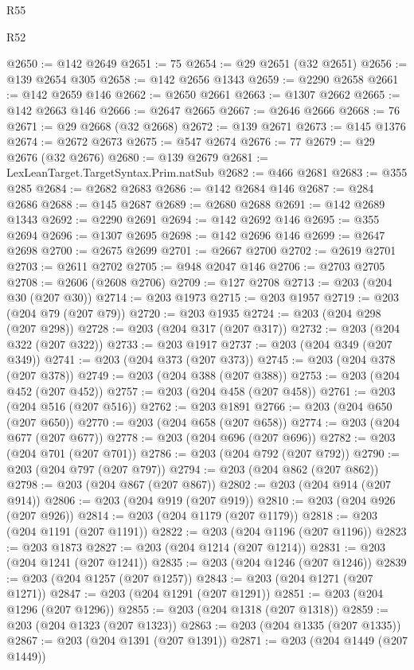 \begin{lexlean}{R55}
\begin{lexlean}{R52}
\begin{coremodule}
{{{{{{{{{{{{{{{{{{{{{{{{{{{{{{{{{{{{{{{{{{{{{{{{{{{{{{{{{{{{{{{{{{{{{{{{{{{{{{{{{{{{{{{{{{{{{{{{{{{{{{{{{{{{{{{{{{{{{{{{{{{{{{{{{{{{{{{{{{{{{{{{{{{{{{{{{{{{{{{{{{{{{{{{{{{{{{{{{{{{{{{{{{{{{{{{{{{{{{@2650 := @142 @2649
@2651 := 75
@2654 := @29 @2651 (@32 @2651)
@2656 := @139 @2654 @305
@2658 := @142 @2656 @1343
@2659 := @2290 @2658
@2661 := @142 @2659 @146
@2662 := @2650 @2661
@2663 := @1307 @2662
@2665 := @142 @2663 @146
@2666 := @2647 @2665
@2667 := @2646 @2666
@2668 := 76
@2671 := @29 @2668 (@32 @2668)
@2672 := @139 @2671
@2673 := @145 @1376
@2674 := @2672 @2673
@2675 := @547 @2674
@2676 := 77
@2679 := @29 @2676 (@32 @2676)
@2680 := @139 @2679
@2681 := LexLeanTarget.TargetSyntax.Prim.natSub
@2682 := @466 @2681
@2683 := @355 @285
@2684 := @2682 @2683
@2686 := @142 @2684 @146
@2687 := @284 @2686
@2688 := @145 @2687
@2689 := @2680 @2688
@2691 := @142 @2689 @1343
@2692 := @2290 @2691
@2694 := @142 @2692 @146
@2695 := @355 @2694
@2696 := @1307 @2695
@2698 := @142 @2696 @146
@2699 := @2647 @2698
@2700 := @2675 @2699
@2701 := @2667 @2700
@2702 := @2619 @2701
@2703 := @2611 @2702
@2705 := @948 @2047 @146
@2706 := @2703 @2705
@2708 := @2606 (@2608 @2706)
@2709 := @127 @2708
@2713 := @203 (@204 @30 (@207 @30))
@2714 := @203 @1973
@2715 := @203 @1957
@2719 := @203 (@204 @79 (@207 @79))
@2720 := @203 @1935
@2724 := @203 (@204 @298 (@207 @298))
@2728 := @203 (@204 @317 (@207 @317))
@2732 := @203 (@204 @322 (@207 @322))
@2733 := @203 @1917
@2737 := @203 (@204 @349 (@207 @349))
@2741 := @203 (@204 @373 (@207 @373))
@2745 := @203 (@204 @378 (@207 @378))
@2749 := @203 (@204 @388 (@207 @388))
@2753 := @203 (@204 @452 (@207 @452))
@2757 := @203 (@204 @458 (@207 @458))
@2761 := @203 (@204 @516 (@207 @516))
@2762 := @203 @1891
@2766 := @203 (@204 @650 (@207 @650))
@2770 := @203 (@204 @658 (@207 @658))
@2774 := @203 (@204 @677 (@207 @677))
@2778 := @203 (@204 @696 (@207 @696))
@2782 := @203 (@204 @701 (@207 @701))
@2786 := @203 (@204 @792 (@207 @792))
@2790 := @203 (@204 @797 (@207 @797))
@2794 := @203 (@204 @862 (@207 @862))
@2798 := @203 (@204 @867 (@207 @867))
@2802 := @203 (@204 @914 (@207 @914))
@2806 := @203 (@204 @919 (@207 @919))
@2810 := @203 (@204 @926 (@207 @926))
@2814 := @203 (@204 @1179 (@207 @1179))
@2818 := @203 (@204 @1191 (@207 @1191))
@2822 := @203 (@204 @1196 (@207 @1196))
@2823 := @203 @1873
@2827 := @203 (@204 @1214 (@207 @1214))
@2831 := @203 (@204 @1241 (@207 @1241))
@2835 := @203 (@204 @1246 (@207 @1246))
@2839 := @203 (@204 @1257 (@207 @1257))
@2843 := @203 (@204 @1271 (@207 @1271))
@2847 := @203 (@204 @1291 (@207 @1291))
@2851 := @203 (@204 @1296 (@207 @1296))
@2855 := @203 (@204 @1318 (@207 @1318))
@2859 := @203 (@204 @1323 (@207 @1323))
@2863 := @203 (@204 @1335 (@207 @1335))
@2867 := @203 (@204 @1391 (@207 @1391))
@2871 := @203 (@204 @1449 (@207 @1449))
}}}}}}}}}}}}}}}}}}}}}}}}}}}}}}}}}}}}}}}}}}}}}}}}}}}}}}}}}}}}}}}}}}}}}}}}}}}}}}}}}}}}}}}}}}}}}}}}}}}}}}}}}}}}}}}}}}}}}}}}}}}}}}}}}}}}}}}}}}}}}}}}}}}}}}}}}}}}}}}}}}}}}}}}}}}}}}}}}}}}}}}}}}}}}}}}}}}}}}
\end{coremodule}
\end{lexlean}
\end{lexlean}

